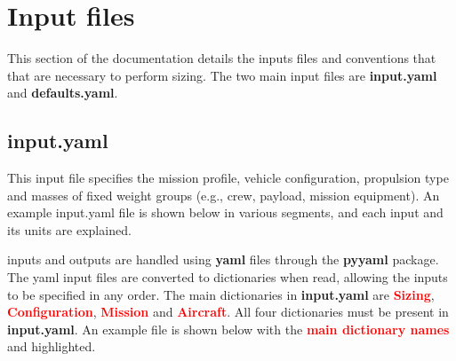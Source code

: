 \section{Input files}
This section of the documentation details the inputs files and conventions that that are necessary to perform sizing. The two main input files are \textbf{input.yaml} and \textbf{defaults.yaml}.

\subsection{\textbf{input.yaml}}

This input file specifies the mission profile, vehicle configuration, propulsion type and masses of fixed weight groups (e.g., crew, payload, mission equipment). An example input.yaml file is shown below in various segments, and each input and its units are explained.

\hydra \spc inputs and outputs are handled using \textbf{yaml} files through the \textbf{pyyaml} package. The yaml input files are converted to \python \spc dictionaries when read, allowing the inputs to be specified in any order. The main dictionaries in \textbf{input.yaml} are \textcolor{red}{\textbf{Sizing}}, \textcolor{red}{\textbf{Configuration}}, \textcolor{red}{\textbf{Mission}} and \textcolor{red}{\textbf{Aircraft}}. All four dictionaries must be present in \textbf{input.yaml}. An example file is shown below with the \textcolor{red}{\textbf{main dictionary names}} and  highlighted.

